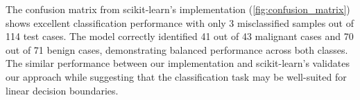 The confusion matrix from scikit-learn's implementation (\cref{fig:confusion_matrix}) shows excellent classification performance with only 3 misclassified samples out of 114 test cases. The model correctly identified 41 out of 43 malignant cases and 70 out of 71 benign cases, demonstrating balanced performance across both classes. The similar performance between our implementation and scikit-learn's validates our approach while suggesting that the classification task may be well-suited for linear decision boundaries.

